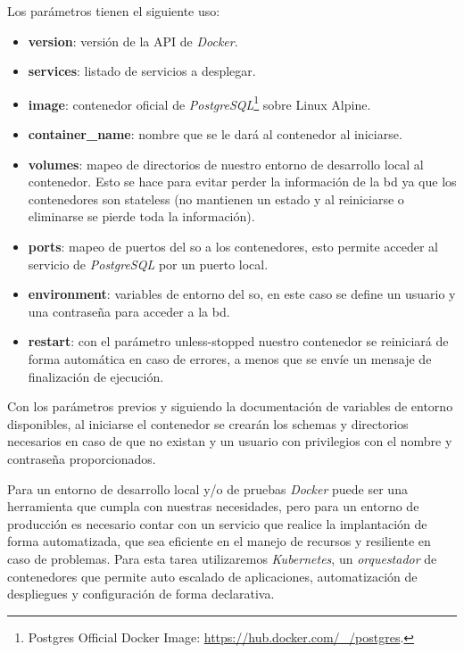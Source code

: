 \documentclass[11pt,spanish,listoffigures,listoftables]{tfgetsinf}
\begin{document}
Los parámetros tienen el siguiente uso: 
\begin{itemize}
	\item \textbf{version}: versión de la API de \textit{Docker}.
	\item \textbf{services}: listado de servicios a desplegar.
    \item \textbf{image}: \gls{contenedor} oficial de \textit{PostgreSQL}\footnote{Postgres Official Docker Image: \url{https://hub.docker.com/_/postgres}.} sobre Linux Alpine.
	\item \textbf{container\_name}: nombre que se le dará al \gls{contenedor} al iniciarse.
	\item \textbf{volumes}: mapeo de directorios de nuestro entorno de desarrollo local al \gls{contenedor}. Esto se hace para evitar perder la información de la \acrshort{bd} ya que los \gls{contenedor}es son \foreignlanguage{english}{stateless} (no mantienen un estado y al reiniciarse o eliminarse se pierde toda la información).
    \item \textbf{ports}: mapeo de puertos del \acrshort{so} a los \gls{contenedor}es, esto permite acceder al servicio de \textit{PostgreSQL} por un puerto local.
    \item \textbf{environment}: variables de entorno del \acrshort{so}, en este caso se define un usuario y una contraseña para acceder a la \acrshort{bd}.
    \item \textbf{restart}: con el parámetro \foreignlanguage{english}{unless-stopped} nuestro \gls{contenedor} se reiniciará de forma automática en caso de errores, a menos que se envíe un mensaje de finalización de ejecución.
\end{itemize}

Con los parámetros previos y siguiendo la documentación de variables de entorno disponibles, al iniciarse el \gls{contenedor} se crearán los \foreignlanguage{english}{schemas} y directorios necesarios en caso de que no existan y un usuario con privilegios con el nombre y contraseña proporcionados.

Para un entorno de desarrollo local y/o de pruebas \textit{Docker} puede ser una herramienta que cumpla con nuestras necesidades, pero para un entorno de producción es necesario contar con un servicio que realice la implantación de forma automatizada, que sea eficiente en el manejo de recursos y resiliente en caso de problemas. Para esta tarea utilizaremos \textit{Kubernetes}, un \textit{orquestador} de \gls{contenedor}es que permite auto escalado de aplicaciones, automatización de despliegues y configuración de forma declarativa.
\end{document}
